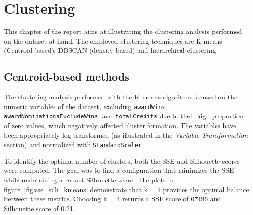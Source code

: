 \chapter{Clustering}
\label{ch:capitolo2}

This chapter of the report aims at illustrating the clustering analysis performed on the dataset at hand.
The employed clustering techniques are K-means (Centroid-based), DBSCAN (density-based) and hierarchical clustering.

\section{Centroid-based methods}\label{sec:centroid_based} %
The clustering analysis performed with the K-means algorithm focused on the numeric variables of the dataset, excluding \texttt{awardWins}, \texttt{awardNominationsExcludeWins}, and \texttt{totalCredits} due to their high proportion of zero values, which negatively affected cluster formation. 
The variables have been appropriately log-transformed (as illustrated in the \textit{Variable Transformation} section) and normalized with \texttt{StandardScaler}.

To identify the optimal number of clusters, both the SSE and Silhouette scores were computed. The goal was to find a configuration that minimizes the SSE while maintaining a robust Silhouette score. 
The plots in figure~\ref{fig:sse_silh_kmeans} demonstrate that k = 4 provides the optimal balance between these metrics. Choosing k = 4 returns a SSE score of 67496 and Silhouette score of 0.21. 

